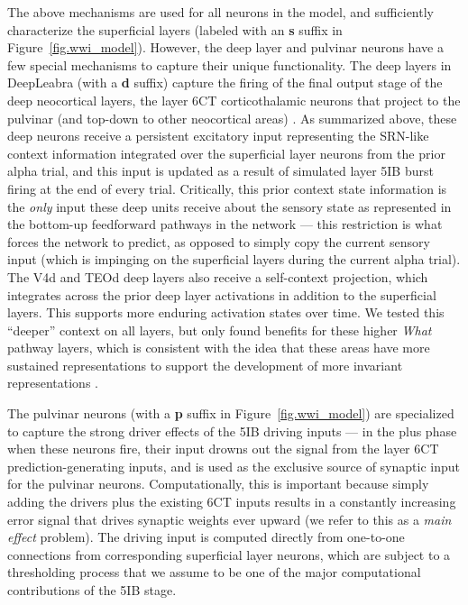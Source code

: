 \documentclass[11pt,twoside]{article}
\newif\myifpdf
\begin{document}
The above mechanisms are used for all neurons in the model, and sufficiently characterize the superficial layers (labeled with an {\bf s} suffix in Figure~\ref{fig.wwi_model}).  However, the deep layer and pulvinar neurons have a few special mechanisms to capture their unique functionality.  The deep layers in DeepLeabra (with a {\bf d} suffix) capture the firing of the final output stage of the deep neocortical layers, the layer 6CT corticothalamic neurons that project to the pulvinar (and top-down to other neocortical areas) \cite{Thomson10,ThomsonLamy07}.  As summarized above, these deep neurons receive a persistent excitatory input representing the SRN-like context information integrated over the superficial layer neurons from the prior alpha trial, and this input is updated as a result of simulated layer 5IB burst firing at the end of every trial.  Critically, this prior context state information is the {\em only} input these deep units receive about the sensory state as represented in the bottom-up feedforward pathways in the network --- this restriction is what forces the network to predict, as opposed to simply copy the current sensory input (which is impinging on the superficial layers during the current alpha trial).   The V4d and TEOd deep layers also receive a self-context projection, which integrates across the prior deep layer activations in addition to the superficial layers.  This supports more enduring activation states over time.  We tested this ``deeper'' context on all layers, but only found benefits for these higher {\em What} pathway layers, which is consistent with the idea that these areas have more sustained representations to support the development of more invariant representations \cite{Foldiak91,OReillyJohnson94,WiskottSejnowski02}.

The pulvinar neurons (with a {\bf p} suffix in Figure~\ref{fig.wwi_model}) are specialized to capture the strong driver effects of the 5IB driving inputs --- in the plus phase when these neurons fire, their input drowns out the signal from the layer 6CT prediction-generating inputs, and is used as the exclusive source of synaptic input for the pulvinar neurons.  Computationally, this is important because simply adding the drivers plus the existing 6CT inputs results in a constantly increasing error signal that drives synaptic weights ever upward (we refer to this as a {\em main effect} problem).  The driving input is computed directly from one-to-one connections from corresponding superficial layer neurons, which are subject to a thresholding process that we assume to be one of the major computational contributions of the 5IB stage.
\end{document}
